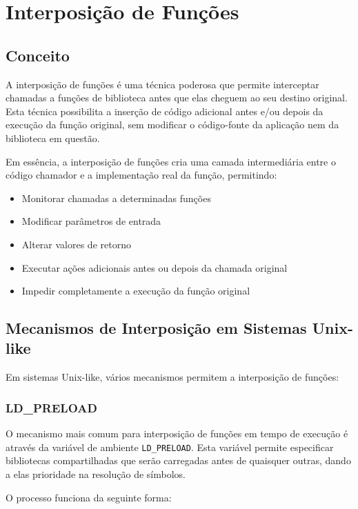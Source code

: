 \section{Interposição de Funções}\label{sec:interposicao}

\subsection{Conceito}

A interposição de funções é uma técnica poderosa que permite interceptar chamadas a funções de biblioteca antes que elas cheguem ao seu destino original. Esta técnica possibilita a inserção de código adicional antes e/ou depois da execução da função original, sem modificar o código-fonte da aplicação nem da biblioteca em questão.

Em essência, a interposição de funções cria uma camada intermediária entre o código chamador e a implementação real da função, permitindo:
\begin{itemize}
    \item Monitorar chamadas a determinadas funções
    \item Modificar parâmetros de entrada
    \item Alterar valores de retorno
    \item Executar ações adicionais antes ou depois da chamada original
    \item Impedir completamente a execução da função original
\end{itemize}

\subsection{Mecanismos de Interposição em Sistemas Unix-like}

Em sistemas Unix-like, vários mecanismos permitem a interposição de funções:

\subsubsection{LD_PRELOAD}

O mecanismo mais comum para interposição de funções em tempo de execução é através da variável de ambiente \texttt{LD_PRELOAD}. Esta variável permite especificar bibliotecas compartilhadas que serão carregadas antes de quaisquer outras, dando a elas prioridade na resolução de símbolos.

O processo funciona da seguinte forma:

